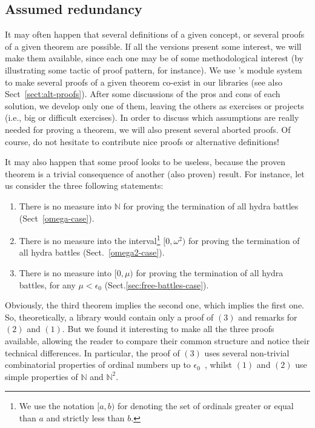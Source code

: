 \documentclass[twoside,a4paper]{book}
\begin{document}
\subsection{Assumed redundancy}

It may often happen that several definitions of a given concept, or several proofs of a given theorem are possible. If all the versions present some interest, we will make them available, since each one may be of some methodological 
interest (by illustrating some tactic of proof pattern, for instance).
We use \coq's module system to make several proofs of a given theorem co-exist in our libraries (see also Sect~\vref{sect:alt-proofs}).
After some discussions of the pros and cons of each solution, we develop only one of them, leaving the others  as exercises or projects (i.e., big or difficult exercises).
In order to discuss which assumptions are really needed for proving a theorem, we will also present 
several aborted proofs.
Of course, do not hesitate to contribute nice proofs or alternative definitions!

It may also happen that some proof looks to be useless, because the proven theorem is a trivial consequence of another (also proven) result.
For instance, let us consider the three following statements:
\begin{enumerate}
\item There is no measure into $\mathbb{N}$ for proving the termination of all hydra battles (Sect~\vref{omega-case}).
\item There is no measure into the interval\footnote{We use the notation $[a,b)$ for denoting the set of ordinals greater or equal than $a$ and strictly less than $b$.}  $[0,\omega^2)$ for proving the termination of all hydra battles (Sect.~\vref{omega2-case}).
\item There is no measure into $[0,\mu)$ for proving the termination of all hydra battles, for any $\mu<\epsilon_0$ (Sect.\vref{sec:free-battles-case}).
\end{enumerate}

Obviously, the third theorem implies the second one, which implies the first one. So, theoretically, a library would contain only a proof of $(3)$ and remarks for $(2)$ and $(1)$. But we found it interesting to make all the three proofs available, allowing the reader to compare their common structure and notice their technical differences.
In particular, the proof of $(3)$ uses several non-trivial combinatorial properties of ordinal numbers up to $\epsilon_0$~\cite{KS81}, whilst $(1)$ and $(2)$ use simple properties of $\mathbb{N}$ and $\mathbb{N}^2$.
\end{document}

